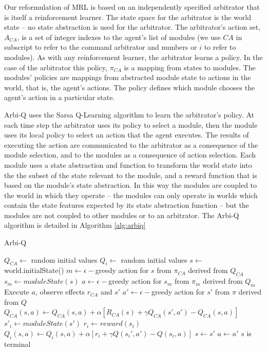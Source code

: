 Our reformulation of MRL is based on an independently specified arbitrator \cite{brooks1986a-robust} that is itself a reinforcement learner. The state space for the arbitrator is the world state -- no state abstraction is used for the arbitrator. The arbitrator's action set, $A_{CA}$, is a set of integer indexes to the agent's list of modules (we use $CA$ in subscript to refer to the command arbitrator and numbers or $i$ to refer to modules).  As with any reinforcement learner, the arbitrator learns a policy. In the case of the arbitrator this policy, $\pi_{CA}$ is a mapping from states to modules. The modules' policies are mappings from abstracted module state to actions in the world, that is, the agent's actions. The policy defines which module chooses the agent's action in a particular state.

Arbi-Q uses the Sarsa Q-Learning algorithm to learn the arbitrator's policy. At each time step the arbitrator uses its policy to select a module, then the module uses its local policy to select an action that the agent executes. The results of executing the action are communicated to the arbitrator as a consequence of the module selection, and to the modules as a consequence of action selection. Each module uses a state abstraction and function to transform the world state into the the subset of the state relevant to the module, and a reward function that is based on the module's state abstraction. In this way the modules are coupled to the world in which they operate -- the modules can only operate in worlds which contain the state features expected by its state abstraction function -- but the modules are not coupled to other modules or to an arbitrator. The Arbi-Q algorithm is detailed in Algorithm \ref{alg:arbiq}


\begin{algorithm}
  \caption{Arbi-Q}\label{alg:arbiq}
  \begin{algorithmic}
    \State $Q_{CA} \gets$ random initial values
       \State $Q_{i} \gets$ random initial values
    \EndFor
      \State $s \gets$ world.initialState()
      \State $m \gets \epsilon-$greedy action for $s$ from $\pi_{CA}$ derived from $Q_{CA}$ 
      \State $s_{m} \gets moduleState(s)$ 
      \State $a \gets \epsilon-$greedy action for $s_{m}$ from $\pi_m$ derived from $Q_m$
      \Repeat
        \State Execute $a$, observe effects $r_{CA}$ and $s'$
        \State $a' \gets \epsilon-$greedy action for $s'$ from $\pi$ derived from $Q$
        \State $Q_{CA}(s, a) \gets Q_{CA}(s, a) + \alpha [R_{CA}(s) + \gamma Q_{CA}(s', a') - Q_{CA}(s, a)]$
          \State $s'_{i} \gets moduleState(s')$ 
          \State $r_i \gets reward(s_i)$ 
          \State $Q_i(s, a) \gets Q_i(s, a) + \alpha [r_i + \gamma Q(s_i', a') - Q(s_i, a)]$
        \EndFor
        \State $s \gets s'$
        \State $a \gets a'$
      \Until $s$ is terminal
    \EndFor
  \end{algorithmic}
\end{algorithm}

